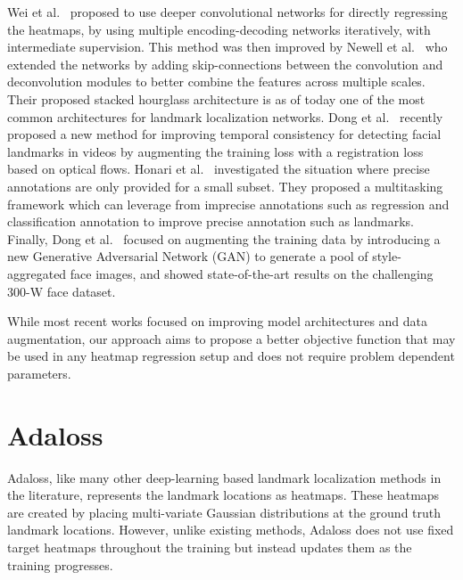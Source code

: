 \documentclass[10pt,twocolumn,letterpaper]{article}
\begin{document}
Wei et al.~\cite{wei} proposed to use deeper convolutional networks
for directly regressing the heatmaps, by using multiple encoding-decoding
networks iteratively, with intermediate supervision. This method
was then improved by Newell et al.~\cite{hg} who extended the networks
by adding skip-connections between the convolution and deconvolution modules
to better combine the features across multiple scales. Their proposed stacked
hourglass architecture is as of today one of the most common architectures
for landmark localization networks. Dong et al.~\cite{sbr} recently proposed
a new method for improving temporal consistency for detecting facial landmarks
in videos by augmenting the training loss with a registration loss based on
optical flows. Honari et al.~\cite{honari2018} investigated the situation
where precise annotations are only provided for a small subset. They proposed
a multitasking framework which can leverage from imprecise annotations such as
regression and classification annotation to improve precise annotation such
as landmarks. Finally, Dong et al.~\cite{san} focused on augmenting the training
data by introducing a new Generative Adversarial Network (GAN) \cite{gan} to generate
a pool of style-aggregated face images, and showed state-of-the-art results on the
challenging 300-W face dataset.

While most recent works focused on improving model architectures and data augmentation,
our approach aims to propose a better objective function that may
be used in any heatmap regression setup and does not require problem
dependent parameters.
 

\section{Adaloss}
















Adaloss, like many other deep-learning based landmark localization methods in the literature, represents the landmark locations as heatmaps. These heatmaps are created by placing multi-variate Gaussian distributions at the ground truth landmark locations. However, unlike existing methods, Adaloss does not use fixed target heatmaps throughout the training but instead  updates them as the training progresses. 
\end{document}
